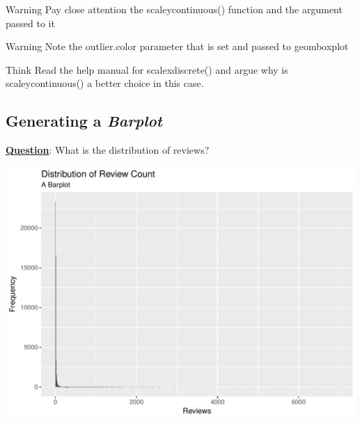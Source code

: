 \documentclass[12pt]{book}\usepackage{knitr}
\begin{document}
\begin{DIY}{Warning}
\noindent Pay close attention the scale\textunderscore y\textunderscore continuous() function and the argument passed to it
\end{DIY}

\begin{DIY}{Warning}
\noindent Note the outlier$.$color parameter that is set and passed to geom\textunderscore boxplot  
\end{DIY}

\begin{DIY}{Think}
\noindent Read the help manual for scale\textunderscore x\textunderscore discrete() and argue why is scale\textunderscore y\textunderscore continuous() a better choice in this case.
\end{DIY}


\subsection{Generating a \textbf{\emph{Barplot}}}
\noindent \textbf{\underline{Question}}: What is the distribution of reviews? 
\begin{knitrout}
\color{fgcolor}\begin{kframe}
\begin{alltt}
 \hlkwb{<-}   
 \hlopt{+}
\hlstd{(}  \hlopt{$}  \hlopt{+}
\hlstd{()} \hlopt{+}
\hlstd{(} \hlstd{,}
          \hlstd{=}  \hlstd{)} \hlopt{+}
\hlstd{(}\hlstd{)} \hlopt{+} \hlstd{(}\hlstd{)} 
\end{alltt}
\end{kframe}
\includegraphics[width=\maxwidth]{figure/BarPlot-1} 

\end{knitrout}
\end{document}
